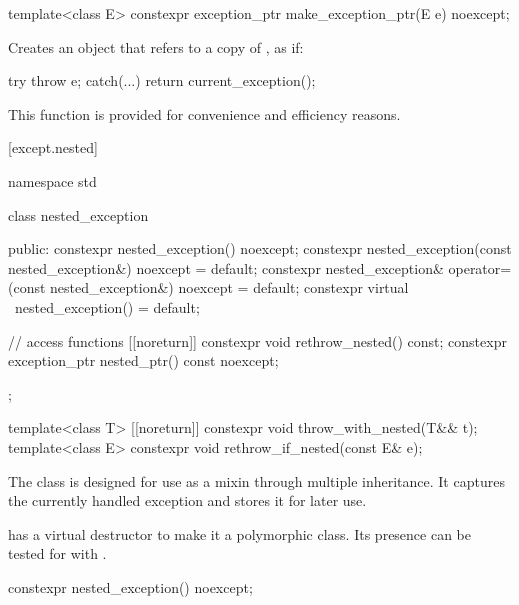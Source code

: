 %
\begin{itemdecl}
template<class E> constexpr exception_ptr make_exception_ptr(E e) noexcept;
\end{itemdecl}

\begin{itemdescr}
\pnum
\effects
Creates an  object that refers to a copy of , as if:
\begin{codeblock}
try {
  throw e;
} catch(...) {
  return current_exception();
}
\end{codeblock}

\pnum
\begin{note}
This function is provided for convenience and
efficiency reasons.
\end{note}
\end{itemdescr}

[except.nested]{}

%
\begin{codeblock}
namespace std {
  class nested_exception {
  public:
    constexpr nested_exception() noexcept;
    constexpr nested_exception(const nested_exception&) noexcept = default;
    constexpr nested_exception& operator=(const nested_exception&) noexcept = default;
    constexpr virtual ~nested_exception() = default;

    // access functions
    [[noreturn]] constexpr void rethrow_nested() const;
    constexpr exception_ptr nested_ptr() const noexcept;
  };

  template<class T> [[noreturn]] constexpr void throw_with_nested(T&& t);
  template<class E> constexpr void rethrow_if_nested(const E& e);
}
\end{codeblock}

\pnum
The class  is designed for use as a mixin through
multiple inheritance. It captures the currently handled exception and stores it
for later use.

\pnum
\begin{note}
 has a virtual destructor to make it a
polymorphic class. Its presence can be tested for with .
\end{note}

%
\begin{itemdecl}
constexpr nested_exception() noexcept;
\end{itemdecl}

